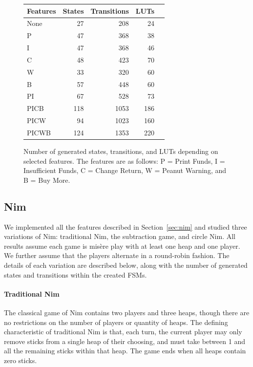 \documentclass[sigplan,anonymous,review]{acmart}
\begin{document}
\begin{figure}
    \centering
\begin{tabular}{lrrrr}\toprule
Features &States &Transitions &LUTs \\\midrule
None &27 &208 &24 \\
P &47 &368 &38 \\
I &47 &368 &46 \\
C &48 &423 &70 \\
W &33 &320 &60 \\
B &57 &448 &60 \\
PI &67 &528 &73 \\
PICB &118 &1053 &186 \\
PICW &94 &1023 &160 \\
PICWB &124 &1353 &220 \\
\bottomrule
\end{tabular}
    \caption{Number of generated states, transitions, and LUTs depending on selected features. The features are as follows: P = Print Funds, I = Insufficient Funds, C = Change Return, W = Peanut Warning, and B = Buy More.}
    \label{fig:vmData}
\end{figure}

\subsection{Nim}\label{sec:nimresults}

We implemented all the features described in Section~\ref{sec:nim} and studied three variations of Nim: traditional Nim, the subtraction game, and circle Nim. All results assume each game is mis\`{e}re play with at least one heap and one player. We further assume that the players alternate in a round-robin fashion. The details of each variation are described below, along with the number of generated states and transitions within the created FSMs. 

\paragraph{Traditional Nim}
The classical game of Nim contains two players and three heaps, though there are no restrictions on the number of players or quantity of heaps. The defining characteristic of traditional Nim is that, each turn, the current player may only remove sticks from a single heap of their choosing, and must take between 1 and all the remaining sticks within that heap. The game ends when all heaps contain zero sticks. 
\end{document}
